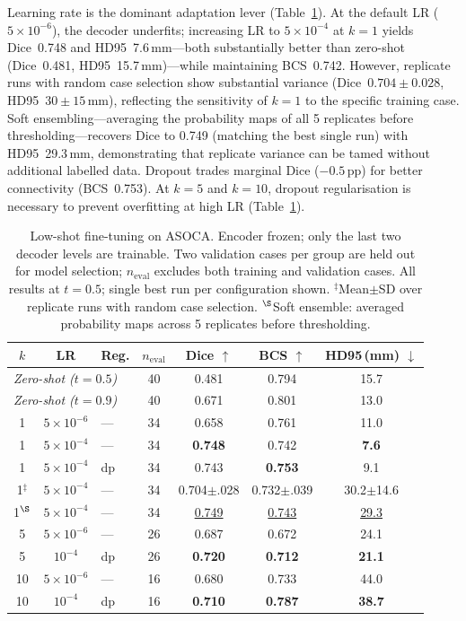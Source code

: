 \documentclass[runningheads]{llncs}
\begin{document}
Learning rate is the dominant adaptation lever (Table~\ref{tab:lowshot}).
At the default LR ($5{\times}10^{-6}$), the decoder underfits; increasing LR to $5{\times}10^{-4}$ at $k{=}1$ yields Dice~0.748 and HD95~7.6\,mm---both substantially better than zero-shot (Dice~0.481, HD95~15.7\,mm)---while maintaining BCS~0.742.
However, replicate runs with random case selection show substantial variance (Dice~$0.704{\pm}0.028$, HD95~$30{\pm}15$\,mm), reflecting the sensitivity of $k{=}1$ to the specific training case.
Soft ensembling---averaging the probability maps of all 5 replicates before thresholding---recovers Dice to 0.749 (matching the best single run) with HD95~29.3\,mm, demonstrating that replicate variance can be tamed without additional labelled data.
Dropout trades marginal Dice ($-0.5$\,pp) for better connectivity (BCS~0.753).
At $k{=}5$ and $k{=}10$, dropout regularisation is necessary to prevent overfitting at high LR (Table~\ref{tab:lowshot}).

\begin{table}[t]
\caption{Low-shot fine-tuning on ASOCA. Encoder frozen; only the last two decoder levels are trainable. Two validation cases per group are held out for model selection; $n_{\mathrm{eval}}$ excludes both training and validation cases. All results at $t{=}0.5$; single best run per configuration shown. $^\ddagger$Mean$\pm$SD over replicate runs with random case selection. $^\S$Soft ensemble: averaged probability maps across 5 replicates before thresholding.}
\label{tab:lowshot}
\centering
\small
\begin{tabular}{cclcccc}
\toprule
$k$ & LR & Reg. & $n_{\mathrm{eval}}$ & Dice $\uparrow$ & BCS $\uparrow$ & HD95\,(mm) $\downarrow$ \\
\midrule
\multicolumn{3}{l}{\textit{Zero-shot ($t{=}0.5$)}} & 40 & 0.481 & 0.794 & 15.7 \\
\multicolumn{3}{l}{\textit{Zero-shot ($t{=}0.9$)}} & 40 & 0.671 & 0.801 & 13.0 \\
\midrule
1  & $5{\times}10^{-6}$ & ---  & 34 & 0.658 & 0.761 & 11.0 \\
1  & $5{\times}10^{-4}$ & ---  & 34 & \textbf{0.748} & 0.742 & \textbf{7.6} \\
1  & $5{\times}10^{-4}$ & dp   & 34 & 0.743 & \textbf{0.753} & 9.1 \\
\rowcolor{gray!8}
1$^\ddagger$  & $5{\times}10^{-4}$ & ---  & 34 & 0.704$\pm$.028 & 0.732$\pm$.039 & 30.2$\pm$14.6 \\
\rowcolor{gray!8}
1$^\S$  & $5{\times}10^{-4}$ & ---  & 34 & \underline{0.749} & \underline{0.743} & \underline{29.3} \\
\midrule
5  & $5{\times}10^{-6}$ & ---  & 26 & 0.687 & 0.672 & 24.1 \\
5  & $10^{-4}$          & dp   & 26 & \textbf{0.720} & \textbf{0.712} & \textbf{21.1} \\
\midrule
10 & $5{\times}10^{-6}$ & ---  & 16 & 0.680 & 0.733 & 44.0 \\
10 & $10^{-4}$          & dp   & 16 & \textbf{0.710} & \textbf{0.787} & \textbf{38.7} \\
\bottomrule
\end{tabular}
\end{table}
\end{document}

